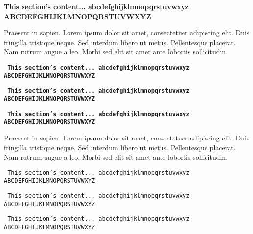 \textbf{
\normalsize{This section's content...\newline
abcdefghijklmnopqrstuvwxyz\newline
ABCDEFGHIJKLMNOPQRSTUVWXYZ}}

Praesent in sapien. Lorem ipsum dolor sit amet, consectetuer adipiscing elit.
Duis fringilla tristique neque. Sed interdum libero ut metus. Pellentesque placerat.
Nam rutrum augue a leo. Morbi sed elit sit amet ante lobortis sollicitudin.

\clearpage %

\texttt{
\textbf{
\small{This section's content...\newline
abcdefghijklmnopqrstuvwxyz\newline
ABCDEFGHIJKLMNOPQRSTUVWXYZ}}}

\texttt{
\textbf{
\tiny{This section's content...\newline
abcdefghijklmnopqrstuvwxyz\newline
ABCDEFGHIJKLMNOPQRSTUVWXYZ}}}

\texttt{
\textbf{
\normalsize{This section's content...\newline
abcdefghijklmnopqrstuvwxyz\newline
ABCDEFGHIJKLMNOPQRSTUVWXYZ}}}

Praesent in sapien. Lorem ipsum dolor sit amet, consectetuer adipiscing elit.
Duis fringilla tristique neque. Sed interdum libero ut metus. Pellentesque placerat.
Nam rutrum augue a leo. Morbi sed elit sit amet ante lobortis sollicitudin.

\texttt{
\small{This section's content...\newline
abcdefghijklmnopqrstuvwxyz\newline
ABCDEFGHIJKLMNOPQRSTUVWXYZ}}

\texttt{
\tiny{This section's content...\newline
abcdefghijklmnopqrstuvwxyz\newline
ABCDEFGHIJKLMNOPQRSTUVWXYZ}}

\texttt{
\normalsize{This section's content...\newline
abcdefghijklmnopqrstuvwxyz\newline
ABCDEFGHIJKLMNOPQRSTUVWXYZ}}

